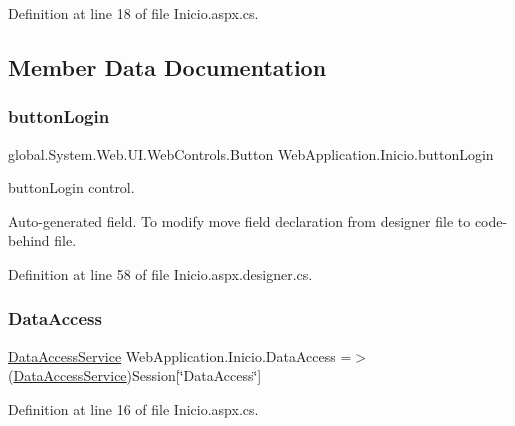 Definition at line 18 of file Inicio.\+aspx.\+cs.



\subsection{Member Data Documentation}
\mbox{\label{classWebApplication_1_1Inicio_a3a35697eb44344439551b307b06fd36b}} 
\subsubsection{\texorpdfstring{buttonLogin}{buttonLogin}}
{\footnotesize\ttfamily global.\+System.\+Web.\+U\+I.\+Web\+Controls.\+Button Web\+Application.\+Inicio.\+button\+Login\hspace{0.3cm}{\ttfamily [protected]}}



button\+Login control. 

Auto-\/generated field. To modify move field declaration from designer file to code-\/behind file. 

Definition at line 58 of file Inicio.\+aspx.\+designer.\+cs.

\mbox{\label{classWebApplication_1_1Inicio_af08ee9b91d0d180dfe4778c6da094365}} 
\subsubsection{\texorpdfstring{DataAccess}{DataAccess}}
{\footnotesize\ttfamily \mbox{\hyperlink{classDataBaseAccess_1_1DataAccessService}{Data\+Access\+Service}} Web\+Application.\+Inicio.\+Data\+Access =$>$ (\mbox{\hyperlink{classDataBaseAccess_1_1DataAccessService}{Data\+Access\+Service}})Session\mbox{[}\char`\"{}Data\+Access\char`\"{}\mbox{]}\hspace{0.3cm}{\ttfamily [private]}}



Definition at line 16 of file Inicio.\+aspx.\+cs.

\mbox{\label{classWebApplication_1_1Inicio_a6060adcae37ac670afcf5c3ba229d926}} 
